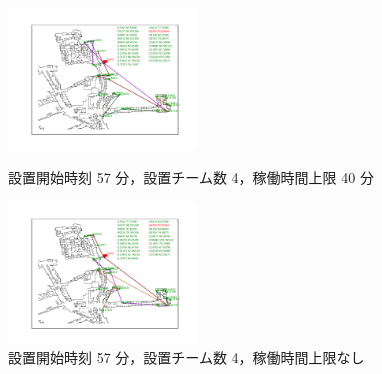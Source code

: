 \documentclass[a4paper,12pt,fleqn]{jarticle}
\begin{document}
\begin{figure}
 \begin{center}
  \begin{minipage}{0.49\hsize}
   \begin{center}
    \includegraphics[width=5cm,trim=100 50 100 50]{fig/57min_4team_lim40min.pdf}
    \caption{設置開始時刻 57 分，\newline \quad 設置チーム数 4，稼働時間上限 40 分}
    \label{fig:57min_4team_lim40min}
   \end{center}
  \end{minipage}
  \begin{minipage}{0.49\hsize}
   \begin{center}
    \includegraphics[width=5cm,trim=100 50 100 50]{fig/57min_4team_nolim.pdf}
    \caption{設置開始時刻 57 分，\newline \quad 設置チーム数 4，稼働時間上限なし}
    \label{fig:57min_4team_nolim}
   \end{center}
  \end{minipage}
 \end{center}
\end{figure}
\end{document}

